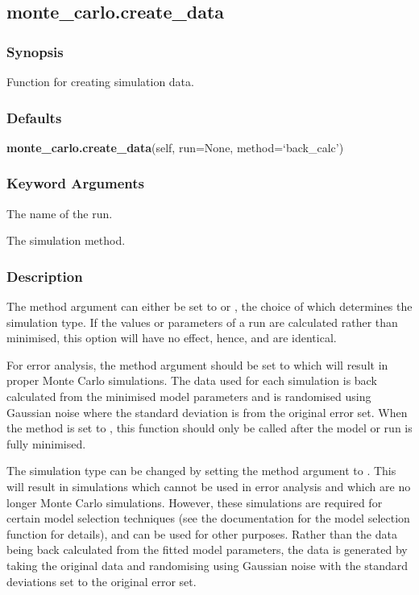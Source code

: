 \newpage

\subsection{monte\_carlo.create\_data}


\subsubsection{Synopsis}

Function for creating simulation data.

\subsubsection{Defaults}

\textsf{\textbf{monte\_carlo.create\_data}(self, run=None, method=`back\_calc')}


\subsubsection{Keyword Arguments}


  The name of the run.

  The simulation method.

\subsubsection{Description}

The method argument can either be set to 
 or 
, the choice of which
determines the simulation type.  If the values or parameters of a run are calculated rather
than minimised, this option will have no effect, hence, 
 and 
 are
identical.

For error analysis, the method argument should be set to 
 which will result in
proper Monte Carlo simulations.  The data used for each simulation is back calculated from
the minimised model parameters and is randomised using Gaussian noise where the standard
deviation is from the original error set.  When the method is set to 
, this
function should only be called after the model or run is fully minimised.

The simulation type can be changed by setting the method argument to 
.  This will
result in simulations which cannot be used in error analysis and which are no longer Monte
Carlo simulations.  However, these simulations are required for certain model selection
techniques (see the documentation for the model selection function for details), and can be
used for other purposes.  Rather than the data being back calculated from the fitted model
parameters, the data is generated by taking the original data and randomising using Gaussian
noise with the standard deviations set to the original error set.



